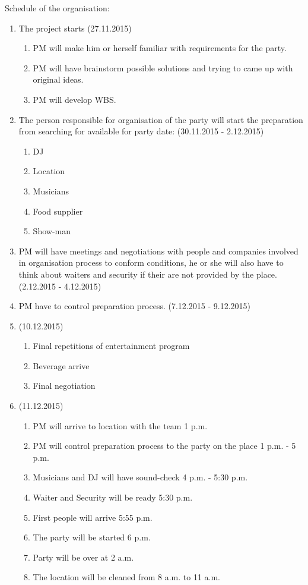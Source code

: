 \documentclass[english]{article}
\begin{document}
Schedule of the organisation:
\begin{enumerate}
\item The project starts (27.11.2015)
\begin{enumerate}
\item PM will make him or herself familiar with requirements for the party.
\item PM will have brainstorm possible solutions and trying to came up with original ideas.
\item PM will develop WBS.
\end{enumerate}
\item The person responsible for organisation of the party will start the preparation from searching for available for party date: (30.11.2015 - 2.12.2015)
\begin{enumerate}
\item DJ
\item Location
\item Musicians
\item Food supplier
\item Show-man
\end{enumerate}
\item PM will have meetings and negotiations with people and companies involved in organisation process to conform conditions, he or she will also have to think about waiters and security if their are not provided by the place.(2.12.2015 - 4.12.2015)
\item PM have to control preparation  process. (7.12.2015 - 9.12.2015)
\item (10.12.2015)
\begin{enumerate}
\item Final repetitions of entertainment program 
\item Beverage arrive
\item Final negotiation
\end{enumerate}
\item (11.12.2015)
\begin{enumerate}
\item PM will arrive to location with the team 1 p.m. 
\item PM will control preparation process to the party on the place 1 p.m.  - 5 p.m.
\item Musicians and DJ will have sound-check 4 p.m. - 5:30 p.m.
\item Waiter and Security will be ready 5:30 p.m.
\item First people will arrive 5:55 p.m.
\item The party will be started 6 p.m. 
\item Party will be over at 2 a.m.
\item The location will be cleaned from 8 a.m. to 11 a.m.
\end{enumerate}
\end{enumerate}
\end{document}

